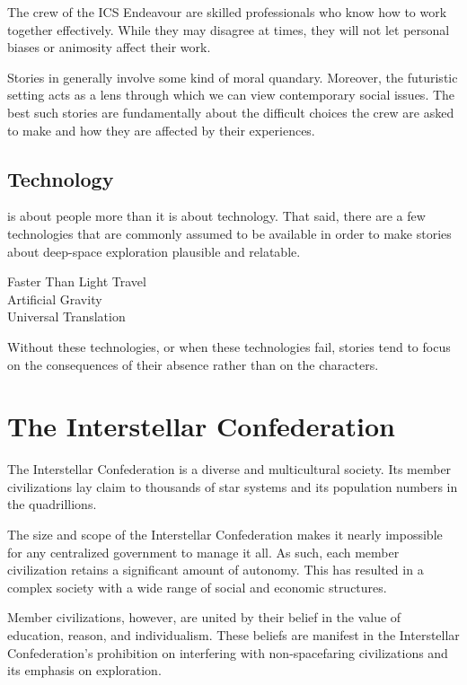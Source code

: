 \documentclass[11pt, a5paper, parskip=half-, DIV=12]{scrartcl}
\begin{document}
The crew of the ICS Endeavour are skilled professionals who know how to work together effectively. While they may disagree at times, they will not let personal biases or animosity affect their work.

Stories in \ENDEAVOUR{} generally involve some kind of moral quandary. Moreover, the futuristic setting acts as a lens through which we can view contemporary social issues. The best such stories are fundamentally about the difficult choices the crew are asked to make and how they are affected by their experiences.  

\subsection*{Technology}
\ENDEAVOUR{} is about people more than it is about technology. That said, there are a few technologies that are commonly assumed to be available in order to make stories about deep-space exploration plausible and relatable.
\begin{description}
	\item[Faster Than Light Travel]
	\item[Artificial Gravity]
	\item[Universal Translation]
\end{description}
Without these technologies, or when these technologies fail, stories tend to focus on the consequences of their absence rather than on the characters.

\newpage

\section*{The Interstellar Confederation}
The Interstellar Confederation is a diverse and multicultural society. Its member civilizations lay claim to thousands of star systems and its population numbers in the quadrillions. 

The size and scope of the Interstellar Confederation makes it nearly impossible for any centralized government to manage it all. As such, each member civilization retains a significant amount of autonomy. This has resulted in a complex society with a wide range of social and economic structures.

Member civilizations, however, are united by their belief in the value of education, reason, and individualism. These beliefs are manifest in the Interstellar Confederation's prohibition on interfering with non-spacefaring civilizations and its emphasis on exploration.
\end{document}

